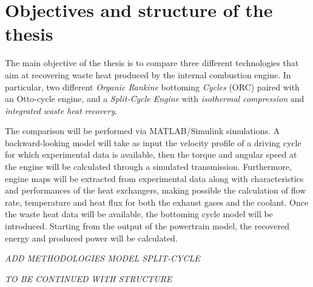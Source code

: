 \section{Objectives and structure of the thesis}

The main objective of the thesis is to compare three different technologies that aim at recovering waste heat produced by the internal combustion engine. In particular, two different \emph{Organic Rankine} bottoming \emph{Cycles} (ORC) paired with an Otto-cycle engine, and a \emph{Split-Cycle Engine} with \emph{isothermal compression} and \emph{integrated waste heat recovery}.

The comparison will be performed via MATLAB/Simulink simulations. A backward-looking model will take as input the velocity profile of a driving cycle for which experimental data is available, then the torque and angular speed at the engine will be calculated through a simulated transmission. Furthermore, engine maps will be extracted from experimental data along with characteristics and performances of the heat exchangers, making possible the calculation of flow rate, temperature and heat flux for both the exhaust gases and the coolant. Once the waste heat data will be available, the bottoming cycle model will be introduced. Starting from the output of the powertrain model, the recovered energy and produced power will be calculated.

\emph{ADD METHODOLOGIES MODEL SPLIT-CYCLE}

\emph{TO BE CONTINUED WITH STRUCTURE}


